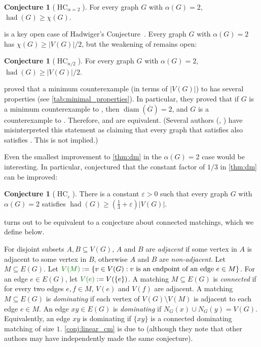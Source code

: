 \documentclass[11pt]{article}
\numberwithin{equation}{section}
\theoremstyle{plain}
\theoremstyle{definition}
\newtheorem{conj}[thm]{Conjecture}
\renewcommand{\geq}{\geqslant}
\DeclareMathOperator{\diam}{diam}
\DeclareMathOperator{\had}{had}
\DeclareMathOperator{\HC}{HC}
\newcommand{\defn}[1]{\textcolor{green!50!black}{\textit{#1}}}
\newcommand{\mathdefn}[1]{\textcolor{green!50!black}{#1}}
\newcommand{\conjdefn}[1]{\textcolor{red!50!black}{#1}}
\begin{document}
\begin{conj}[\conjdefn{$\HC_{\alpha = 2}$}]
    For every graph $G$ with $\alpha(G) = 2$, $\had(G) \geq \chi(G)$. \label{conj:hc_chi}
\end{conj}
 is a key open case of Hadwiger's Conjecture~\citep{PST03,CS12,Blasiak07,CO08,Bosse19,NS26a}. Every graph $G$ with $\alpha(G) = 2$ has $\chi(G) \geq |V(G)|/2$, but the weakening of  remains open:
\begin{conj}[\conjdefn{$\HC_{n/2}$}]
    For every graph $G$ with $\alpha(G) = 2$, $\had(G) \geq |V(G)|/2$. \label{conj:hc_half}
\end{conj}
\citet{PST03} proved that a minimum counterexample (in terms of $|V(G)|$) to  has several properties (see \cref{tab:minimal_properties}).  In particular, they proved that if $G$ is a minimum counterexample to , then $\diam(\overline{G}) = 2$, and $G$ is a counterexample to . Therefore,  and  are equivalent. (Several authors (\citep[Theorem 1.2]{Bosse19}, \citep[Theorem 1.3]{Zhou23}) have misinterpreted this statement as claiming that every graph that satisfies  also satisfies . This is not implied.)

Even the smallest improvement to \cref{thm:dm} in the $\alpha(G) = 2$ case would be interesting. In particular, \citet{SeymourHC} conjectured that the constant factor of $1/3$ in \cref{thm:dm} can be improved:
\begin{conj}[\conjdefn{$\HC_{\varepsilon}$}]
    \label{conj:hc_epsilon}
    There is a constant $\varepsilon > 0$ such that every graph $G$ with $\alpha(G) = 2$ satisfies $\had(G) \geq (\frac{1}{3} + \varepsilon) |V(G)|$.
\end{conj}
 turns out to be equivalent to a conjecture about connected matchings, which we define below.

\begin{sloppypar}
    For disjoint subsets $A, B \subseteq V(G)$, $A$ and $B$ are \defn{adjacent} if some vertex in $A$ is adjacent to some vertex in $B$, otherwise $A$ and $B$ are \defn{non-adjacent}. Let $M \subseteq E(G)$. Let
    $\mathdefn{V(M)} := \{ v \in V(G) : \text{$v$ is an endpoint of an edge $e \in M$} \}$. For an edge $e \in E(G)$, let $\mathdefn{V(e)}:= V(\{e\})$.
    A matching $M \subseteq E(G)$ is \defn{connected} if for every two edges $e, f \in M$, $V(e)$ and $V(f)$ are adjacent. A
    matching $M \subseteq E(G)$ is \defn{dominating} if each vertex of $V(G) \setminus V(M)$ is adjacent to each edge $e \in M$. An edge $xy \in E(G)$ is \defn{dominating} if $N_G(x) \cup N_G(y) = V(G)$. Equivalently, an edge $xy$ is dominating if $\{xy\}$ is a connected dominating matching of size $1$. \cref{conj:linear_cm} is due to \citet{furedi2005connected} (although they note that other authors may have independently made the same conjecture).
\end{sloppypar}
\end{document}

